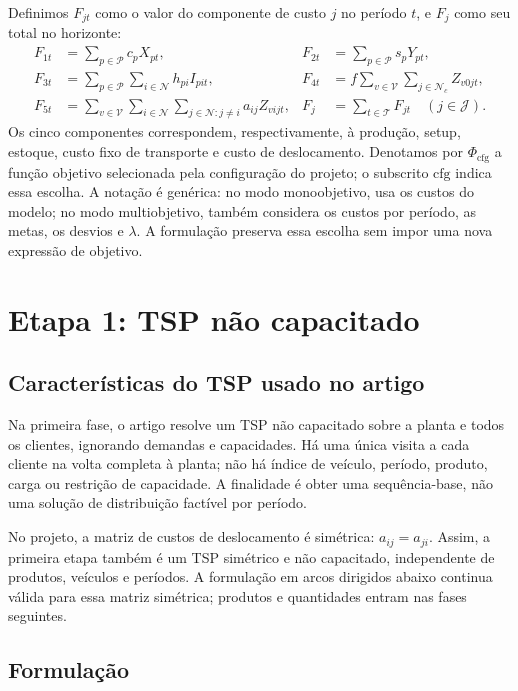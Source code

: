 \documentclass[11pt,a4paper]{article}
\newcommand{\N}{\mathcal{N}}
\newcommand{\Pset}{\mathcal{P}}
\newcommand{\Tset}{\mathcal{T}}
\newcommand{\Vset}{\mathcal{V}}
\begin{document}
Definimos $F_{jt}$ como o valor do componente de custo $j$ no período $t$, e $F_j$ como seu total no horizonte:
\begin{align*}
 F_{1t}&=\sum_{p\in\Pset}c_pX_{pt}, &
 F_{2t}&=\sum_{p\in\Pset}s_pY_{pt},\\
 F_{3t}&=\sum_{p\in\Pset}\sum_{i\in\N}h_{pi}I_{pit}, &
 F_{4t}&=f\sum_{v\in\Vset}\sum_{j\in\N_c}Z_{v0jt},\\
 F_{5t}&=\sum_{v\in\Vset}\sum_{i\in\N}\sum_{j\in\N:j\ne i}a_{ij}Z_{vijt}, &
 F_j&=\sum_{t\in\Tset}F_{jt}\quad(j\in\mathcal J).
\end{align*}
Os cinco componentes correspondem, respectivamente, à produção, setup, estoque, custo fixo de transporte e custo de deslocamento. Denotamos por $\Phi_{\mathrm{cfg}}$ a função objetivo selecionada pela configuração do projeto; o subscrito $\mathrm{cfg}$ indica essa escolha. A notação é genérica: no modo monoobjetivo, usa os custos do modelo; no modo multiobjetivo, também considera os custos por período, as metas, os desvios e $\lambda$. A formulação preserva essa escolha sem impor uma nova expressão de objetivo.

\section{Etapa 1: TSP não capacitado}

\subsection{Características do TSP usado no artigo}

Na primeira fase, o artigo resolve um TSP não capacitado sobre a planta e todos os clientes, ignorando demandas e capacidades. Há uma única visita a cada cliente na volta completa à planta; não há índice de veículo, período, produto, carga ou restrição de capacidade. A finalidade é obter uma sequência-base, não uma solução de distribuição factível por período.

No projeto, a matriz de custos de deslocamento é simétrica: $a_{ij}=a_{ji}$. Assim, a primeira etapa também é um TSP simétrico e não capacitado, independente de produtos, veículos e períodos. A formulação em arcos dirigidos abaixo continua válida para essa matriz simétrica; produtos e quantidades entram nas fases seguintes.

\subsection{Formulação}
\end{document}
